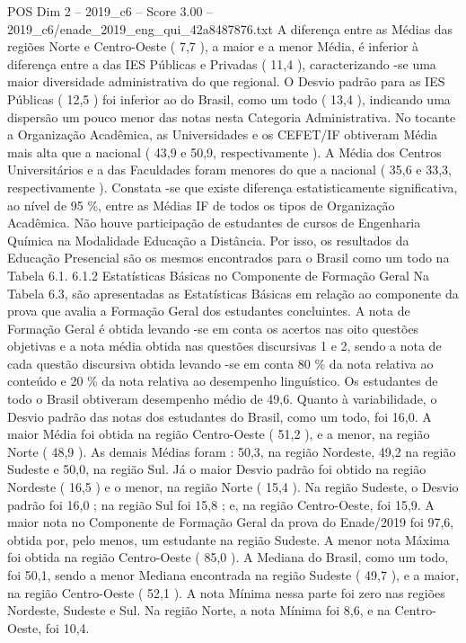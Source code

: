 \begin{textsample}{POS Dim 2 – 2019\_c6 – Score 3.00 – 2019\_c6/enade\_2019\_eng\_qui\_42a8487876.txt}
A diferença entre as Médias das regiões Norte e Centro-Oeste ( 7,7 ), a maior e a menor Média, é inferior à diferença entre a das IES Públicas e Privadas ( 11,4 ), caracterizando -se uma maior diversidade administrativa do que regional.
O Desvio padrão para as IES Públicas ( 12,5 ) foi inferior ao do Brasil, como um todo ( 13,4 ), indicando uma dispersão um pouco menor das notas nesta Categoria Administrativa.
No tocante a Organização Acadêmica, as Universidades e os CEFET/IF obtiveram Média mais alta que a nacional ( 43,9 e 50,9, respectivamente ).
A Média dos Centros Universitários e a das Faculdades foram menores do que a nacional ( 35,6 e 33,3, respectivamente ).
Constata -se que existe diferença estatisticamente significativa, ao nível de 95 \%, entre as Médias IF de todos os tipos de Organização Acadêmica.
Não houve participação de estudantes de cursos de Engenharia Química na Modalidade Educação a Distância.
Por isso, os resultados da Educação Presencial são os mesmos encontrados para o Brasil como um todo na Tabela 6.1. 6.1.2 Estatísticas Básicas no Componente de Formação Geral Na Tabela 6.3, são apresentadas as Estatísticas Básicas em relação ao componente da prova que avalia a Formação Geral dos estudantes concluintes.
A nota de Formação Geral é obtida levando -se em conta os acertos nas oito questões objetivas e a nota média obtida nas questões discursivas 1 e 2, sendo a nota de cada questão discursiva obtida levando -se em conta 80 \% da nota relativa ao conteúdo e 20 \% da nota relativa ao desempenho linguístico.
Os estudantes de todo o Brasil obtiveram desempenho médio de 49,6.
Quanto à variabilidade, o Desvio padrão das notas dos estudantes do Brasil, como um todo, foi 16,0.
A maior Média foi obtida na região Centro-Oeste ( 51,2 ), e a menor, na região Norte ( 48,9 ).
As demais Médias foram : 50,3, na região Nordeste, 49,2 na região Sudeste e 50,0, na região Sul.
Já o maior Desvio padrão foi obtido na região Nordeste ( 16,5 ) e o menor, na região Norte ( 15,4 ).
Na região Sudeste, o Desvio padrão foi 16,0 ; na região Sul foi 15,8 ; e, na região Centro-Oeste, foi 15,9.
A maior nota no Componente de Formação Geral da prova do Enade/2019 foi 97,6, obtida por, pelo menos, um estudante na região Sudeste.
A menor nota Máxima foi obtida na região Centro-Oeste ( 85,0 ).
A Mediana do Brasil, como um todo, foi 50,1, sendo a menor Mediana encontrada na região Sudeste ( 49,7 ), e a maior, na região Centro-Oeste ( 52,1 ).
A nota Mínima nessa parte foi zero nas regiões Nordeste, Sudeste e Sul.
Na região Norte, a nota Mínima foi 8,6, e na Centro-Oeste, foi 10,4.

\end{textsample}
